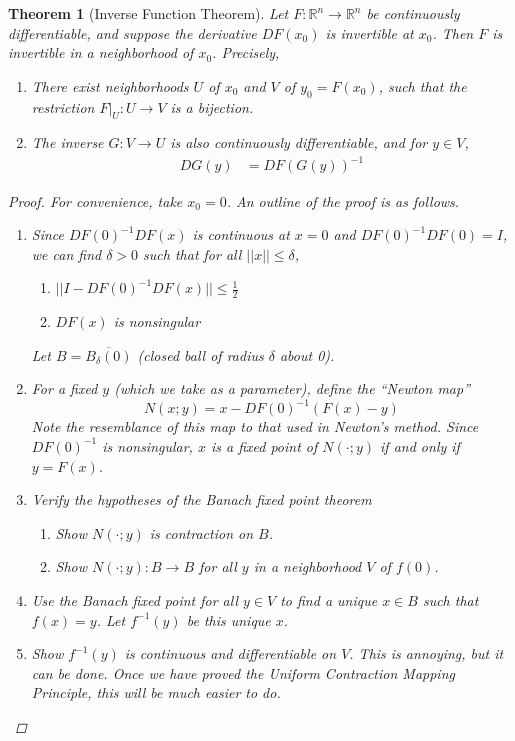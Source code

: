 \documentclass[12pt]{amsart}         %
\newtheorem{theorem}{Theorem}[section]
\theoremstyle{remark}
\newcommand{\R}{\mathbb{R}}
\begin{document}
\begin{theorem}[Inverse Function Theorem]
Let $F: \R^n \rightarrow \R^n$ be continuously differentiable, and suppose the derivative $DF(x_0)$ is invertible at $x_0$. Then $F$ is invertible in a neighborhood of $x_0$. Precisely,

\begin{enumerate}
\item There exist neighborhoods $U$ of $x_0$ and $V$ of $y_0 = F(x_0)$, such that the restriction $F|_U: U \rightarrow V$ is a bijection.
\item The inverse $G: V \rightarrow U$ is also continuously differentiable, and for $y \in V$,
\begin{align}
DG(y) &= DF(G(y))^{-1}
\end{align}
\end{enumerate}
\begin{proof}
For convenience, take $x_0 = 0$. An outline of the proof is as follows.
\begin{enumerate}
    \item Since $DF(0)^{-1} DF(x)$ is continuous at $x = 0$ and $DF(0)^{-1} DF(0) = I$, we can find $\delta > 0$ such that for all $||x|| \leq \delta$,
    \begin{enumerate}
    \item $||I - DF(0)^{-1} DF(x)|| \leq \frac{1}{2}$
    \item $DF(x)$ is nonsingular
    \end{enumerate}
    Let $B = \overline{ B_\delta(0) }$ (closed ball of radius $\delta$ about 0).

    \item For a fixed $y$ (which we take as a parameter), define the ``Newton map'' 
    \begin{equation*}
    N(x; y) = x - DF(0)^{-1}(F(x) - y)
    \end{equation*}
    Note the resemblance of this map to that used in Newton's method. Since $DF(0)^{-1}$ is nonsingular, $x$ is a fixed point of $N(\cdot; y)$ if and only if $y = F(x)$.

    \item Verify the hypotheses of the Banach fixed point theorem
    \begin{enumerate}
    \item Show $N(\cdot; y)$ is contraction on $B$.
    \item Show $N(\cdot; y): B \rightarrow B$ for all $y$ in a neighborhood $V$ of $f(0)$.
    \end{enumerate}
    
    \item Use the Banach fixed point for all $y \in V$ to find a unique $x \in B$ such that $f(x) = y$. Let $f^{-1}(y)$ be this unique $x$.
    
    \item Show $f^{-1}(y)$ is continuous and differentiable on $V$. This is annoying, but it can be done. Once we have proved the Uniform Contraction Mapping Principle, this will be much easier to do.
\end{enumerate}
\end{proof}
\end{theorem}
\end{document}
